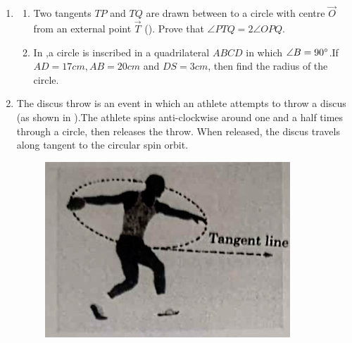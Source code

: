 \documentclass[12pt,A4 paper]{article}
\begin{document}
\begin{enumerate}
\begin{enumerate}                             
\item 47.5\degree  \item42.5\degree          
\item85\degree    \item95\degree    
\end{enumerate}








\item
  \begin{enumerate}
	  \item Two tangents $TP$ and $TQ$ are drawn between to a circle with centre $\vec{O}$ from an external point $\vec{T}$ (). Prove that $\angle PTQ = 2 \angle OPQ$.
\begin{figure}[h]
	        \centering
	        
		\caption{}
		\label{fig:fig:5}
        \end{figure}





\item In ,a circle is inscribed in a quadrilateral $ABCD$ in which $\angle B =90\degree$.If $AD=17cm,AB=20cm$ and $DS=3cm$, then find the radius of the circle.

\begin{figure}[h]
	        \centering
	        
		\caption{}
		\label{fig:fig:6}
\end{figure}
   \end{enumerate}






\item The discus throw is an event in which an athlete attempts to throw a discus (as shown in ).The athlete spins anti-clockwise around one and a half times through a circle, then releases the throw. When released, the discus travels along tangent to the circular spin orbit.


\begin{figure}[H]	
	        \centering
		\includegraphics[width=\columnwidth]{figs/fig0.png}
		\caption{}
		\label{fig:fig:0}
\end{figure}




\end{enumerate}
\end{document}
